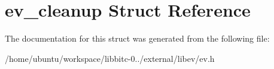 \hypertarget{structev__cleanup}{\section{ev\-\_\-cleanup Struct Reference}
\label{structev__cleanup}
}


The documentation for this struct was generated from the following file\-:\begin{DoxyCompactItemize}
\item 
/home/ubuntu/workspace/libbitc-\/0../external/libev/ev.\-h\end{DoxyCompactItemize}
